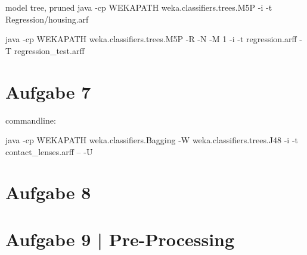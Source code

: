 model tree, pruned
java -cp WEKAPATH weka.classifiers.trees.M5P -i -t Regression/housing.arf


java -cp WEKAPATH weka.classifiers.trees.M5P -R -N -M 1 -i -t regression.arff -T regression\_test.arff

\section{Aufgabe 7}
commandline: 

java -cp WEKAPATH weka.classifiers.Bagging -W weka.classifiers.trees.J48 -i -t contact\_lenses.arff -- -U



\section{Aufgabe 8}



\section{Aufgabe 9 | Pre-Processing}




